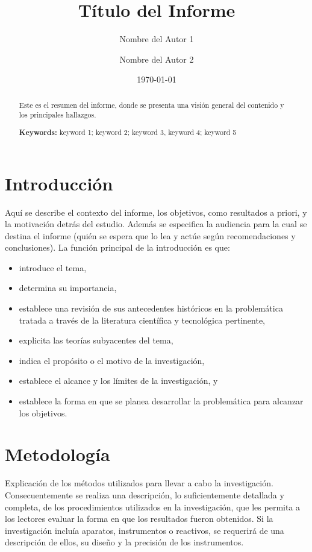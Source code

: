 \documentclass[a4paper,12pt]{article}
\title{Título del Informe}
\author[1]{Nombre del Autor 1}
\author[2]{Nombre del Autor 2}
\affil[1]{Institución 1, Correo Autor 1}
\affil[2]{Institución 2, Correo Autor 2}
\date{\today}
\begin{document}
\maketitle

\begin{abstract}
Este es el resumen del informe, donde se presenta una visión general del contenido y los principales hallazgos.

\textbf{Keywords:} keyword 1; keyword 2; keyword 3, keyword 4; keyword 5
\end{abstract}

\section{Introducción}
Aquí se describe el contexto del informe, los objetivos, como resultados a priori, y la motivación detrás del estudio.
Además se especifica la audiencia para la cual se destina el informe (quién se espera que lo lea y actúe según recomendaciones y conclusiones).
La función principal de la introducción es que:
\begin{itemize}
\item introduce el tema,
\item determina su importancia,
\item establece una revisión de sus antecedentes históricos en la problemática tratada a través de la literatura científica y tecnológica pertinente,
\item explicita las teorías subyacentes del tema,
\item indica el propósito o el motivo de la investigación,
\item establece el alcance y los límites de la investigación, y
\item establece la forma en que se planea desarrollar la problemática para alcanzar los objetivos.


\end{itemize}

\section{Metodología}
Explicación de los métodos utilizados para llevar a cabo la investigación. Consecuentemente se realiza una descripción, lo suficientemente detallada y completa, de los procedimientos utilizados en la investigación, que les permita a los lectores evaluar la forma en que los resultados fueron obtenidos.
Si la investigación incluía aparatos, instrumentos o reactivos, se requerirá de una descripción de ellos, su diseño y la precisión de los instrumentos.
\end{document}

